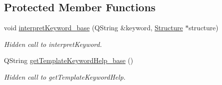 \subsection*{Protected Member Functions}
\begin{DoxyCompactItemize}
\item 
\hypertarget{classGlobalSearch_1_1OptBase_abff4ef4b7e717351103658ff33dfa561}{}void \hyperlink{classGlobalSearch_1_1OptBase_abff4ef4b7e717351103658ff33dfa561}{interpret\+Keyword\+\_\+base} (Q\+String \&keyword, \hyperlink{classGlobalSearch_1_1Structure}{Structure} $\ast$structure)\label{classGlobalSearch_1_1OptBase_abff4ef4b7e717351103658ff33dfa561}

\begin{DoxyCompactList}\small\item\em Hidden call to interpret\+Keyword. \end{DoxyCompactList}\item 
\hypertarget{classGlobalSearch_1_1OptBase_a41a41f9733da4a68244bc56195ea835b}{}Q\+String \hyperlink{classGlobalSearch_1_1OptBase_a41a41f9733da4a68244bc56195ea835b}{get\+Template\+Keyword\+Help\+\_\+base} ()\label{classGlobalSearch_1_1OptBase_a41a41f9733da4a68244bc56195ea835b}

\begin{DoxyCompactList}\small\item\em Hidden call to get\+Template\+Keyword\+Help. \end{DoxyCompactList}\end{DoxyCompactItemize}
